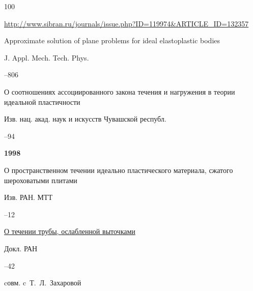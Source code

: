 \begin{thebibliography}{100}

\elink \url{http://www.sibran.ru/journals/issue.php?ID=119974&ARTICLE_ID=132357}

\transl



\paper Approximate solution of plane problems for ideal elastoplastic bodies

\jour J. Appl. Mech. Tech. Phys.



--806 





\paper О соотношениях ассоциированного закона течения и нагружения в теории идеальной пластичности 

\jour Изв. нац. акад. наук и искусств Чувашской республ. 



–94



\item[] \centerline{\bf 1998}




\paper О пространственном течении идеально пластического материала, сжатого шероховатыми плитами 

\jour Изв. РАН. МТТ



–12




\paper \href{http://mi.mathnet.ru/dan3486}{О течении трубы, ослабленной выточками}

\jour Докл. РАН




--42

\miscnote cовм. c~Т.~Л.~Захаровой




\end{thebibliography}
